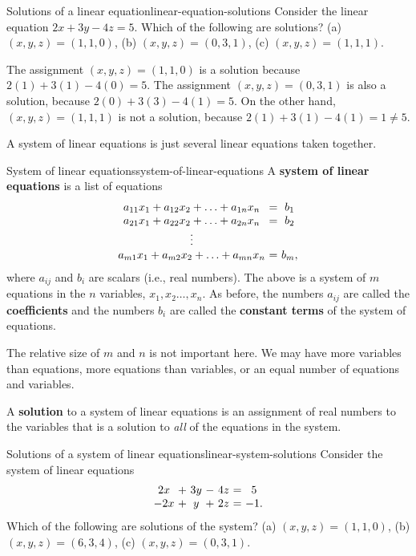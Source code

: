\begin{example}{Solutions of a linear equation}{linear-equation-solutions}
  Consider the linear equation $2x+3y-4z=5$. Which of the following
  are solutions? (a) $(x,y,z)=(1,1,0)$, (b) $(x,y,z)=(0,3,1)$, (c)
  $(x,y,z)=(1,1,1)$.
\end{example}

\begin{solution}
  The assignment $(x,y,z) = (1,1,0)$ is a solution because
  $2(1)+3(1)-4(0) = 5$. The assignment $(x,y,z) = (0,3,1)$ is also a
  solution, because $2(0) + 3(3) - 4(1) = 5$. On the other hand,
  $(x,y,z) = (1,1,1)$ is not a solution, because
  $2(1) + 3(1)-4(1) = 1 \neq 5$.
\end{solution}

A system of linear equations is just several linear equations taken
together.

\begin{definition}{System of linear equations}{system-of-linear-equations}
  A \textbf{system of linear equations}%
   is a list of equations
  \begin{equation*}
    \begin{array}{c@{~}c@{~}c}
      a_{11}x_1+a_{12}x_2+\ldots+a_{1n}x_n&=&b_1 \\
      a_{21}x_1+a_{22}x_2+\ldots+a_{2n}x_n&=&b_2 \\
      \vdots \\
      a_{m1}x_1+a_{m2}x_2+\ldots+a_{mn}x_n&=&b_m,
    \end{array}
  \end{equation*}
  where $a_{ij}$ and $b_i$ are scalars (i.e., real numbers). The above
  is a system of $m$ equations in the $n$ variables,
  $x_1,x_2\ldots,x_n$.  As before, the numbers $a_{ij}$ are called the
  \textbf{coefficients}%
   and the numbers $b_i$ are called the
  \textbf{constant terms}%
   of the system of equations.
\end{definition}

The relative size of $m$ and $n$ is not important here. We may have
more variables than equations, more equations than variables, or an
equal number of equations and variables.

A \textbf{solution}%
 to a system of linear
equations is an assignment of real numbers to the variables that is a
solution to {\em all} of the equations in the system.

\begin{example}{Solutions of a system of linear equations}{linear-system-solutions}
  Consider the system of linear equations
  \begin{equation*}
    \begin{array}{c@{~}c@{~}c@{~}c@{~}c@{~}c@{~}c}
      2x&+&3y&-&4z &=& 5 \\
      -2x&+&y&+&2z &=& -1.
    \end{array}
  \end{equation*}
  Which of the following are solutions of the system? (a)
  $(x,y,z)=(1,1,0)$, (b) $(x,y,z)=(6,3,4)$, (c) $(x,y,z)=(0,3,1)$.
\end{example}

